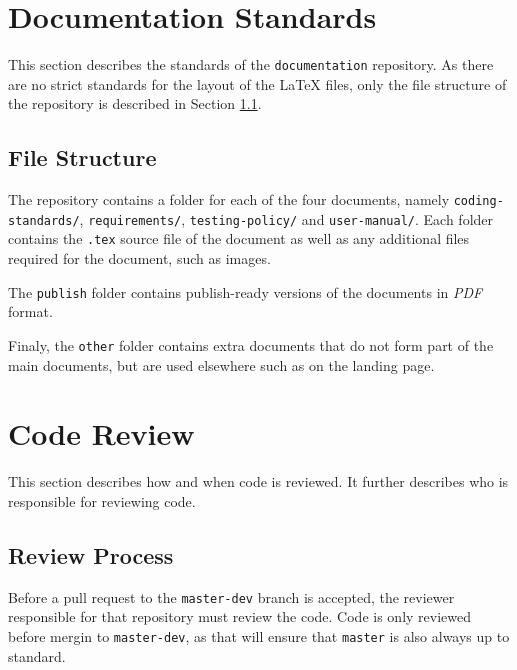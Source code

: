\documentclass{article}
\begin{document}

    \section{Documentation Standards}
    \label{sec:documentation}

    This section describes the standards of the \texttt{documentation}
    repository. As there are no strict standards for the layout of the \LaTeX
    files, only the file structure of the repository is described in Section
    \ref{sec:doc-struc}.

    \subsection{File Structure}
    \label{sec:doc-struc}

    The repository contains a folder for each of the four documents, namely
    \texttt{coding-standards/}, \texttt{requirements/}, \texttt{testing-policy/}
    and \texttt{user-manual/}. Each folder contains the \texttt{.tex} source
    file of the document as well as any additional files required for the
    document, such as images.

    The \texttt{publish} folder contains publish-ready versions of the documents
    in \textit{PDF} format.

    Finaly, the \texttt{other} folder contains extra documents that do not form
    part of the main documents, but are used elsewhere such as on the landing
    page.

    \newpage


    \section{Code Review}
    \label{sec:review}

    This section describes how and when code is reviewed. It further describes
    who is responsible for reviewing code.

    \subsection{Review Process}
    \label{sec:review-proc}

    Before a pull request to the \texttt{master-dev} branch is accepted, the
    reviewer responsible for that repository must review the code. Code is
    only reviewed before mergin to \texttt{master-dev}, as that will ensure
    that \texttt{master} is also always up to standard.
\end{document}
